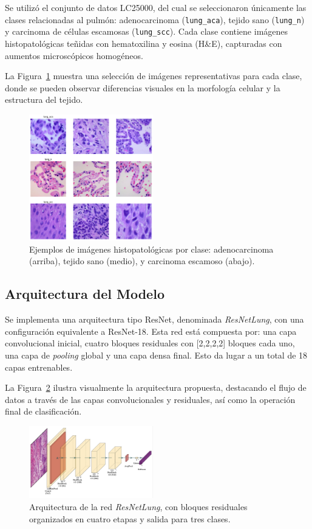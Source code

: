 \documentclass[conference]{IEEEtran}
\begin{document}
Se utilizó el conjunto de datos LC25000, del cual se seleccionaron únicamente las clases relacionadas al pulmón: adenocarcinoma (\texttt{lung\_aca}), tejido sano (\texttt{lung\_n}) y carcinoma de células escamosas (\texttt{lung\_scc}). Cada clase contiene imágenes histopatológicas teñidas con hematoxilina y eosina (H\&E), capturadas con aumentos microscópicos homogéneos.

La Figura~\ref{fig:dataset} muestra una selección de imágenes representativas para cada clase, donde se pueden observar diferencias visuales en la morfología celular y la estructura del tejido.

\begin{figure}[H]
\centering
\includegraphics[width=0.48\textwidth]{dataset_exploration.png}
\caption{Ejemplos de imágenes histopatológicas por clase: adenocarcinoma (arriba), tejido sano (medio), y carcinoma escamoso (abajo).}
\label{fig:dataset}
\end{figure}

\subsection{Arquitectura del Modelo}

Se implementa una arquitectura tipo ResNet, denominada \textit{ResNetLung}, con una configuración equivalente a ResNet-18. Esta red está compuesta por: una capa convolucional inicial, cuatro bloques residuales con [2,2,2,2] bloques cada uno, una capa de \textit{pooling} global y una capa densa final. Esto da lugar a un total de 18 capas entrenables.

La Figura~\ref{fig:architecture} ilustra visualmente la arquitectura propuesta, destacando el flujo de datos a través de las capas convolucionales y residuales, así como la operación final de clasificación.

\begin{figure}[H]
\centering
\includegraphics[width=0.48\textwidth]{resnetlung_architecture.png}
\caption{Arquitectura de la red \textit{ResNetLung}, con bloques residuales organizados en cuatro etapas y salida para tres clases.}
\label{fig:architecture}
\end{figure}
\end{document}
